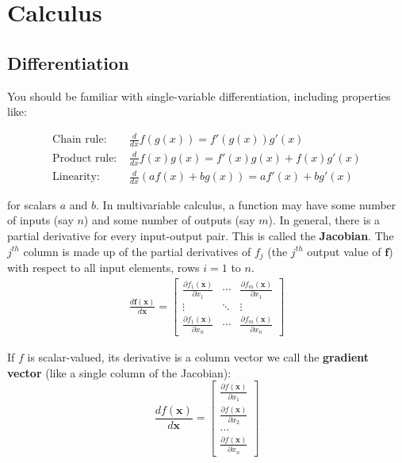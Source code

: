 \documentclass{harvardml}
\theoremstyle{definition}
\theoremstyle{plain}
\newcommand{\p}{\partial}
\renewcommand{\v}[1]{\mathbf{#1}}
\begin{document}
\section{Calculus}
    \subsection{Differentiation}
        
            You should be familiar with single-variable differentiation,
            including properties like:

            \begin{align*}
                \text{Chain rule: } & \frac{d}{d x} f(g(x))= 
				f'(g(x))g'(x)\\
                \text{Product rule: }& \frac{d}{d x} f(x)g(x) = 
				f'(x)g(x) + f(x)g'(x)\\
                \text{Linearity: }& \frac{d}{d x} (af(x) + bg(x)) = 
				af'(x) + bg'(x)
            \end{align*}

            \noindent for scalars $a$ and $b$. In multivariable calculus, 
			a function may have some number of inputs (say $n$) and some 
			number of outputs (say $m$). In general, there is a partial 
			derivative for every input-output pair. This is called the 
			\textbf{Jacobian}. The $j^{th}$ column is made up of the partial 
			derivatives of $f_j$ (the $j^{th}$ output value of $\v f$) with 
			respect to all input elements, rows $i=1$ to $n$.
            \begin{align*}
                \frac{d \mathbf{f}(\mathbf{x})}{d \mathbf{x}} = 
				\begin{bmatrix}
                    \frac{\p f_1(\mathbf{x})}{\p x_1} & 
					\cdots & 
					\frac{\p f_m(\mathbf{x})}{\p x_1} \\
                    \vdots & \ddots & \vdots \\
                    \frac{\p f_1(\mathbf{x})}{\p x_n} & 
					\cdots & \frac{\p f_m(\mathbf{x})}{\p x_n}
                \end{bmatrix}
            \end{align*}
                
            \noindent If $f$ is scalar-valued, its derivative is a 
			column vector we call the \textbf{gradient vector} 
			(like a single column of the Jacobian):
            $$
                 \frac{d f(\mathbf{x})}{d \mathbf{x}}=\begin{bmatrix}
                 \frac{\p f(\mathbf{x})}{\p x_1} \\
                 \frac{\p f(\mathbf{x})}{\p x_2} \\
                 ... \\
                 \frac{\p f(\mathbf{x})}{\p x_n}
                 \end{bmatrix}
            $$
\end{document}
